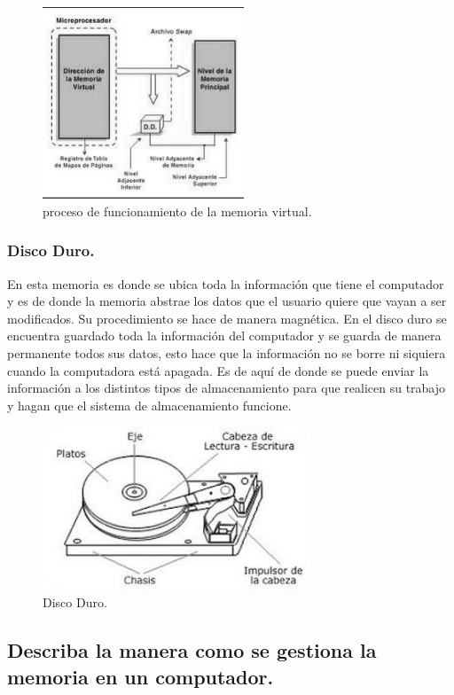 \documentclass{article}
\begin{document}
\begin{figure}[h]
\includegraphics[width=6cm]{imagen4.png}
\centering
\caption{proceso de funcionamiento de la memoria virtual\cite{img4}.}
\label{fig:imagen4}
\end{figure}
\paragraph{}
\subsubsection{Disco Duro.}
En esta memoria es donde se ubica toda la información que tiene el computador y es de donde la memoria abstrae los datos que el usuario quiere que vayan a ser modificados. Su procedimiento se hace de manera magnética. En el disco duro se encuentra guardado toda la información del computador y se guarda de manera permanente todos sus datos, esto hace que la información no se borre ni siquiera cuando la computadora está apagada. Es de aquí de donde se puede enviar la información a los distintos tipos de almacenamiento para que realicen su trabajo y hagan que el sistema de almacenamiento funcione.
\\
\begin{figure}[h]
\includegraphics[width=8cm]{imagen5.jpg}
\centering
\caption{Disco Duro\cite{img5}.}
\label{fig:imagen5}
\end{figure}
\newpage
\subsection{Describa la manera como se gestiona la memoria en un computador.}
\end{document}
